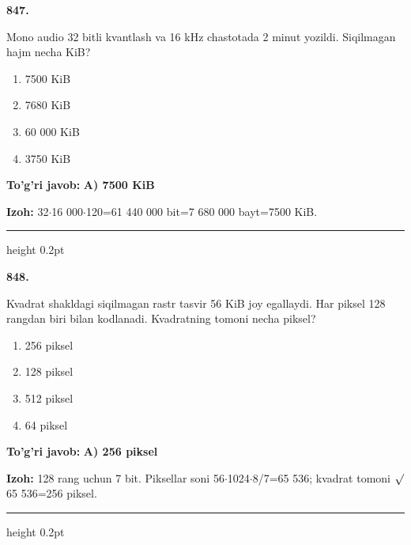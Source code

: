 \documentclass[10pt,a4paper,oneside]{article}
\begin{document}
\noindent\textbf{\color{ink}847.}
\par
Mono audio 32 bitli kvantlash va 16 kHz chastotada 2 minut yozildi. Siqilmagan hajm necha KiB?
\begin{enumerate}[label=\Alph*),leftmargin=9mm]
\item 7500 KiB
\item 7680 KiB
\item 60 000 KiB
\item 3750 KiB
\end{enumerate}
\begin{tcolorbox}[enhanced,breakable,colback=teal!4,colframe=teal!50!black,boxrule=0.5pt,arc=1.1mm,left=3mm,right=3mm,top=1.7mm,bottom=1.7mm,before skip=2mm,after skip=2mm]
\textbf{\color{teal}To'g'ri javob:} \textbf{A) 7500 KiB}
\par\smallskip
\textbf{Izoh:} 32\ensuremath{\cdot}16 000\ensuremath{\cdot}120=61 440 000 bit=7 680 000 bayt=7500 KiB.
\end{tcolorbox}
\vspace{2mm}\hrule height 0.2pt \vspace{3mm}

\noindent\textbf{\color{ink}848.}
\par
Kvadrat shakldagi siqilmagan rastr tasvir 56 KiB joy egallaydi. Har piksel 128 rangdan biri bilan kodlanadi. Kvadratning tomoni necha piksel?
\begin{enumerate}[label=\Alph*),leftmargin=9mm]
\item 256 piksel
\item 128 piksel
\item 512 piksel
\item 64 piksel
\end{enumerate}
\begin{tcolorbox}[enhanced,breakable,colback=teal!4,colframe=teal!50!black,boxrule=0.5pt,arc=1.1mm,left=3mm,right=3mm,top=1.7mm,bottom=1.7mm,before skip=2mm,after skip=2mm]
\textbf{\color{teal}To'g'ri javob:} \textbf{A) 256 piksel}
\par\smallskip
\textbf{Izoh:} 128 rang uchun 7 bit. Piksellar soni 56\ensuremath{\cdot}1024\ensuremath{\cdot}8/7=65 536; kvadrat tomoni \ensuremath{\sqrt{\vphantom{x}}}65 536=256 piksel.
\end{tcolorbox}
\vspace{2mm}\hrule height 0.2pt \vspace{3mm}
\end{document}
